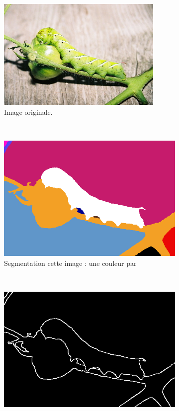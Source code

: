\begin{figure}[htb]
\centering
	 \begin{subfigure}[t]{0.3\textwidth}	
			\includegraphics[width=\textwidth]{images/etat-de-l-art/img-065-im}
		 \caption{Image originale. }
	\end{subfigure}
	~
	 \begin{subfigure}[t]{0.3\textwidth}	
			\includegraphics[width=\textwidth]{images/etat-de-l-art/img-065-seg}
		 \caption{Segmentation  cette image : une couleur par }
	\end{subfigure}
	~
	 \begin{subfigure}[t]{0.3\textwidth}	
			\includegraphics[width=\textwidth]{images/etat-de-l-art/img-065-bdr}

\end{subfigure}
\end{figure}
